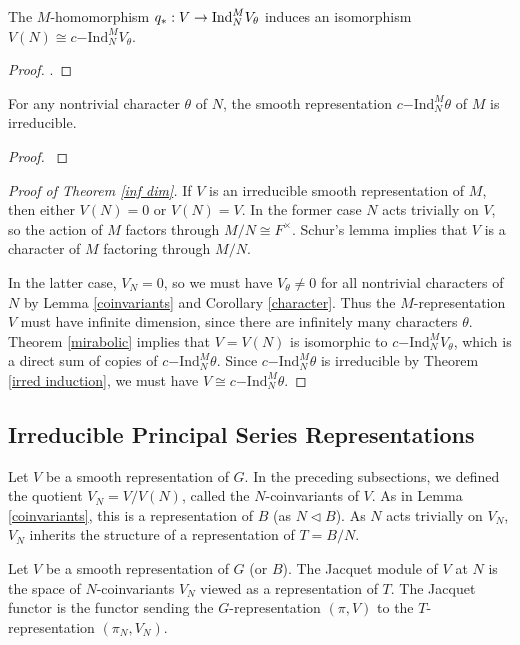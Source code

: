 \begin{thm}\label{mirabolic}
    The $M$-homomorphism $q_*: V \to \mathrm{Ind}_N^M V_\theta$ induces an isomorphism $V(N) \cong c\mathrm{-Ind}_N^M V_\theta$. 
\end{thm}
\begin{proof}
    \cite[Theorem 8.3]{BH1}.
\end{proof}

\begin{thm}\label{irred induction}
    For any nontrivial character $\theta$ of $N$, the smooth representation $c\mathrm{-Ind}_N^M \theta$ of $M$ is irreducible. 
\end{thm}
\begin{proof}
    \cite[Corollary 8.2]{BH1}
\end{proof}

\begin{proof}[Proof of Theorem \ref{inf dim}]
    If $V$ is an irreducible smooth representation of $M$, then either $V(N)=0$ or $V(N)=V$. In the former case $N$ acts trivially on $V$, so the action of $M$ factors through $M/N \cong F^\times$. Schur's lemma implies that $V$ is a character of $M$ factoring through $M/N$. 
    
    In the latter case, $V_N=0$, so we must have $V_\theta \neq 0$ for all nontrivial characters of $N$ by Lemma \ref{coinvariants} and Corollary \ref{character}. Thus the $M$-representation $V$ must have infinite dimension, since there are infinitely many characters $\theta$. Theorem \ref{mirabolic} implies that $V = V(N)$ is isomorphic to $c\mathrm{-Ind}_N^M V_\theta$, which is a direct sum of copies of $c\mathrm{-Ind}_N^M \theta$. Since $c\mathrm{-Ind}_N^M \theta$ is irreducible by Theorem \ref{irred induction}, we must have $V\cong c\mathrm{-Ind}_N^M \theta$. 
\end{proof}




\subsection{Irreducible Principal Series Representations}

Let $V$ be a smooth representation of $G$. In the preceding subsections, we defined the quotient $V_N =V/V(N)$, called the $N$-coinvariants of $V$. As in Lemma \ref{coinvariants}, this is a representation of $B$ (as $N \lhd B$). As $N$ acts trivially on $V_N$, $V_N$ inherits the structure of a representation of $T=B/N$.

\begin{defn}
    Let $V$ be a smooth representation of $G$ (or $B$). The Jacquet module of $V$ at $N$ is the space of $N$-coinvariants $V_N$ viewed as a representation of $T$. The Jacquet functor is the functor sending the $G$-representation $(\pi,V)$ to the $T$-representation $(\pi_N,V_N)$. 
\end{defn}

